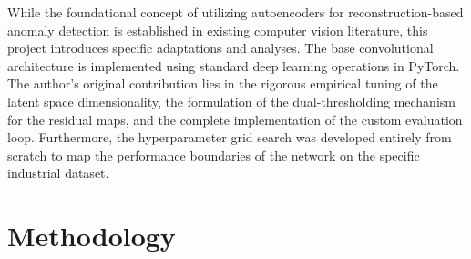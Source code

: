 \documentclass[10pt,twocolumn,a4paper]{article}
\begin{document}
While the foundational concept of utilizing autoencoders for reconstruction-based anomaly detection is established in existing computer vision literature, this project introduces specific adaptations and analyses. The base convolutional architecture is implemented using standard deep learning operations in PyTorch. The author's original contribution lies in the rigorous empirical tuning of the latent space dimensionality, the formulation of the dual-thresholding mechanism for the residual maps, and the complete implementation of the custom evaluation loop. Furthermore, the hyperparameter grid search was developed entirely from scratch to map the performance boundaries of the network on the specific industrial dataset.




	
	\section{Methodology}
	
\end{document}
